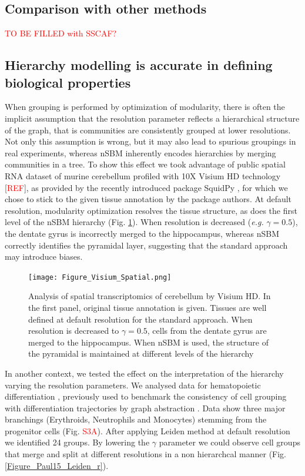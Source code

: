 \documentclass[10pt]{article}
\begin{document}
\subsection*{Comparison with other methods}

\textcolor{red}{TO BE FILLED with SSCAF?}


\subsection*{Hierarchy modelling is accurate in defining biological properties}

When grouping is performed by optimization of modularity, there is often the implicit assumption that the resolution parameter reflects a hierarchical structure of the graph, that is communities are consistently grouped at lower resolutions. Not only this assumption is wrong, but it may also lead to spurious groupings in real experiments, whereas nSBM inherently encodes hierarchies by merging communities in a tree. To show this effect we took advantage of public spatial RNA dataset of murine cerebellum profiled with 10X Visium HD technology [\textcolor{red}{REF}], as provided by the recently introduced package SquidPy \cite{Palla_Theis_2021}, for which we chose to stick to the given tissue annotation by the package authors. At default resolution, modularity optimization resolves the tissue structure, as does the first level of the nSBM hierarchy (Fig. \ref{Figure_Visium}). When resolution is decreased (\emph{e.g.} $\gamma = 0.5$), the dentate gyrus is incorrectly merged to the hippocampus, whereas nSBM correctly identifies the pyramidal layer, suggesting that the standard approach may introduce biases.

\begin{figure}[H]
\centering
\texttt{[image: Figure\_Visium\_Spatial.png]}
\caption[]{Analysis of spatial transcriptomics of cerebellum by Visium HD. In the first panel, original tissue annotation is given. Tissues are well defined at default resolution for the standard approach. When resolution is decreased to $\gamma = 0.5$, cells from the dentate gyrus are merged to the hippocampus. When nSBM is used, the structure of the pyramidal is maintained at different levels of the hierarchy}\label{Figure_Visium}
\end{figure}

In another context, we tested the effect on the interpretation of the hierarchy varying the resolution parameters. We analysed data for hematopoietic differentiation \cite{paul_2015}, previously used to benchmark the consistency of cell grouping with differentiation trajectories by graph abstraction \cite{wolf_2019}. Data show three major branchings (Erythroids, Neutrophils and Monocytes) stemming from the progenitor cells (Fig. \textcolor{red}{S3A}). After applying Leiden method at default resolution we identified 24 groups. By lowering the $\gamma$ parameter we could observe cell groups that merge and split at different resolutions in a non hierarchcal manner (Fig. \ref{Figure_Paul15_Leiden_r}). 
\end{document}
